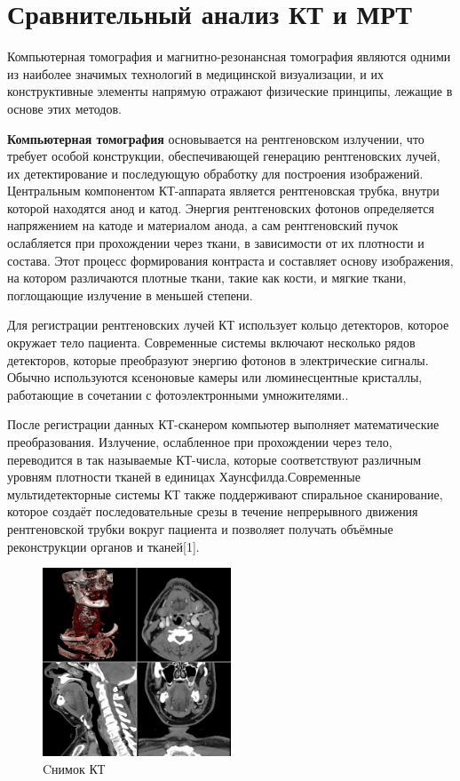 \section{Сравнительный анализ КТ и МРТ}
Компьютерная томография и магнитно-резонансная томография являются одними из наиболее значимых технологий в медицинской визуализации, и их конструктивные элементы напрямую отражают физические принципы, лежащие в основе этих методов.

\textbf{Компьютерная томография} основывается на рентгеновском излучении, что требует особой конструкции, обеспечивающей генерацию рентгеновских лучей, их детектирование и последующую обработку для построения изображений. Центральным компонентом КТ-аппарата является рентгеновская трубка, внутри которой находятся анод и катод. Энергия рентгеновских фотонов определяется напряжением на катоде и материалом анода, а сам рентгеновский пучок ослабляется при прохождении через ткани, в зависимости от их плотности и состава. Этот процесс формирования контраста и составляет основу изображения, на котором различаются плотные ткани, такие как кости, и мягкие ткани, поглощающие излучение в меньшей степени\cite{itmo}.

Для регистрации рентгеновских лучей КТ использует кольцо детекторов, которое окружает тело пациента. Современные системы включают несколько рядов детекторов, которые преобразуют энергию фотонов в электрические сигналы. Обычно используются ксеноновые камеры или люминесцентные кристаллы, работающие в сочетании с фотоэлектронными умножителями.\cite{itmo}.

После регистрации данных КТ-сканером компьютер выполняет математические преобразования. Излучение, ослабленное при прохождении через тело, переводится в так называемые КТ-числа, которые соответствуют различным уровням плотности тканей в единицах Хаунсфилда.Современные мультидетекторные системы КТ также поддерживают спиральное сканирование, которое создаёт последовательные срезы в течение непрерывного движения рентгеновской трубки вокруг пациента и позволяет получать объёмные реконструкции органов и тканей[1].
\begin{figure}[H]
    \centering
    \includegraphics[width=0.5\textwidth]{pic/11.jpg}
    \caption{Cнимок КТ}
    \label{fig:image1}
\end{figure}

